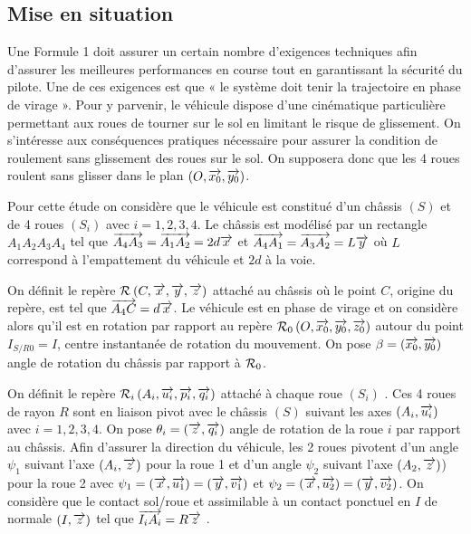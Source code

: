 \documentclass[10pt,fleqn]{article} %
\begin{document}
\ifprof
\else
\begin{multicols}{2}
\fi


\subsection*{Mise en situation}
Une Formule 1 doit assurer un certain nombre d’exigences techniques afin d’assurer les meilleures performances en course tout en garantissant la sécurité du pilote. Une de ces exigences est que « le système doit tenir la trajectoire en phase de virage ». Pour y parvenir, le véhicule dispose d'une cinématique particulière permettant aux roues de tourner sur le sol en limitant le risque de glissement. On s'intéresse aux conséquences pratiques nécessaire pour assurer la condition de roulement sans glissement des roues sur le sol. On supposera donc que les 4 roues roulent sans glisser dans le plan
$\left(O,\overrightarrow{x_0},\overrightarrow{y_0}\right)$. 


Pour cette étude on considère que le véhicule est constitué d’un châssis \textbf{$(S)$} et de 4 roues \textbf{$(S_i)$}
 avec $i=1,2,3,4$.  Le châssis est modélisé par un rectangle $A_1A_2A_3A_4$ tel que 
 $\overrightarrow{A_4 A_3}=\overrightarrow{A_1 A_2}=2d\overrightarrow{x}$ et $\overrightarrow{A_4 A_1}=\overrightarrow{A_3 A_2}=L\overrightarrow{y}$  où $L$ correspond à l’empattement du véhicule et $2d$ à la voie. 


On définit le repère $\mathcal{R}_{}\left({C},\overrightarrow{x},\overrightarrow{y},\overrightarrow{z}\right)$ attaché au châssis où le point $C$, origine du repère, est tel que 
$\overrightarrow{A_4 C}= d\overrightarrow{x}$. Le véhicule est en phase de virage et on considère alors qu’il est en rotation par rapport au
repère $\mathcal{R}_{0}\left({O},\overrightarrow{x_0},\overrightarrow{y_0},\overrightarrow{z_0}\right)$ autour du point $I_{S/R0} = I$, centre instantanée de rotation du mouvement. On pose $\beta=\left(\overrightarrow{x_0},\overrightarrow{y_0}\right)$  angle de rotation du châssis par rapport à $\mathcal{R}_{0}$. 

On définit le repère $\mathcal{R}_{i}\left({A_i},\overrightarrow{u_i},\overrightarrow{p_i},\overrightarrow{q_i}\right)$ attaché à chaque roue $(S_i)$ . Ces 4 roues de rayon $R$ sont en
liaison pivot avec le châssis $(S)$ suivant les axes $\left(A_i,\overrightarrow{u_i}\right)$ avec 
$i=1,2,3,4$. On pose $\theta_i=\left(\overrightarrow{z},\overrightarrow{q_i}\right)$ angle de rotation de la roue $i$ par rapport au châssis. 
Afin d’assurer la direction du véhicule, les 2 roues pivotent d’un angle $\psi_1$ suivant l’axe $\left(A_i,\overrightarrow{z}\right)$ pour la roue 1 et d’un angle $\psi_2$ suivant l’axe $\left(A_2,\overrightarrow{z}\right)$) pour la roue 2 avec $\psi_1=\left(\overrightarrow{x},\overrightarrow{u_1}\right)=\left(\overrightarrow{y},\overrightarrow{v_1}\right)$ et $\psi_2=\left(\overrightarrow{x},\overrightarrow{u_2}\right)=\left(\overrightarrow{y},\overrightarrow{v_2}\right)$. 
On considère que le contact sol/roue et assimilable à un contact ponctuel en $I$ de normale $\left(I,\overrightarrow{z}\right)$ tel que $\overrightarrow{I_i A_i}=R\overrightarrow{z}$ .  




\end{multicols}
\end{document}
